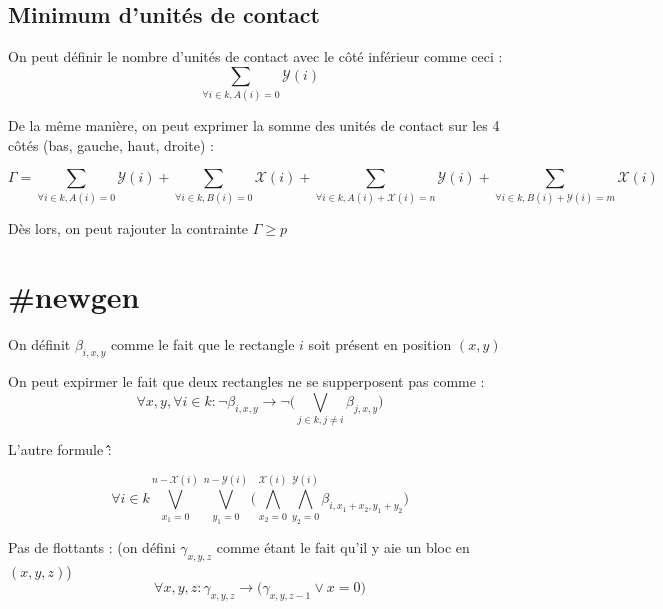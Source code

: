 \documentclass[a4paper]{article}
\begin{document}
\subsection{Minimum d'unités de contact}

On peut définir le nombre d'unités de contact avec le côté inférieur comme ceci :
$$
\sum_{\forall i \in k, A(i) = 0} \mathcal{Y}(i)
$$

De la même manière, on peut exprimer la somme des unités de contact sur les 4 côtés (bas, gauche, haut, droite) :

$$
\Gamma = \sum_{\forall i \in k, A(i) = 0} \mathcal{Y}(i) +
\sum_{\forall i \in k, B(i) = 0} \mathcal{X}(i) +
\sum_{\forall i \in k, A(i) + \mathcal{X}(i) =  n} \mathcal{Y}(i) +
\sum_{\forall i \in k, B(i) + \mathcal{Y}(i) = m} \mathcal{X}(i)
$$

Dès lors, on peut rajouter la contrainte $\Gamma \geq p$


\section{\#newgen}

On définit $\beta_{i, x, y}$ comme le fait que le rectangle $i$ soit présent en position $(x,y)$

On peut expirmer le fait que deux rectangles ne se supperposent pas comme : $$
\forall x,y , \forall i \in k : \lnot \beta_{i, x, y} \rightarrow
\lnot \Big( \bigvee_{j \in k, j \neq i} \beta_{j, x, y} \Big)
$$

L'autre formule \^\^ :

$$
\forall i \in k \bigvee_{x_1=0}^{n-\mathcal{X}(i)} \bigvee_{y_1=0}^{n-\mathcal{Y}(i)}
\Big(
  \bigwedge_{x_2=0}^{\mathcal{X}(i)} \bigwedge_{y_2=0}^{\mathcal{Y}(i)} \beta_{i, x_1 + x_2, y_1 + y_2}
\Big)
$$


Pas de flottants : (on défini $\gamma_{x, y , z}$ comme étant le fait qu'il y aie un bloc en $(x, y , z)$)
$$
\forall x,y,z : \gamma_{x, y, z} \rightarrow  \Big( \gamma_{x, y, z - 1}  \lor x = 0 \Big)
$$
\end{document}
